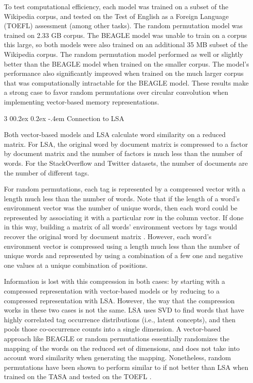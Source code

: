 \documentclass[man,floatsintext,donotrepeattitle]{apa6}
\makeatletter
\renewcommand{\subsubsection}{%
  \@startsection
  {subsubsection}%
  {3}%
  {\parindent}%
  {0\baselineskip \@plus 0.2ex \@minus 0.2ex}%
  {-.4em}%
  {\normalfont\normalsize\bfseries\addperi}}
\makeatother
\begin{document}
To test computational efficiency, each model was trained on a subset of the Wikipedia corpus, and tested on the Test of English as a Foreign Language (TOEFL) assessment (among other tasks).
The random permutation model was trained on \num{2.33} GB corpus.
The BEAGLE model was unable to train on a corpus this large, so both models were also trained on an additional \num{35} MB subset of the Wikipedia corpus.
The random permutation model performed as well or slightly better than the BEAGLE model when trained on the smaller corpus.
The model's performance also significantly improved when trained on the much larger corpus that was computationally intractable for the BEAGLE model.
These results make a strong case to favor random permutations over circular convolution when implementing vector-based memory representations.

\subsubsection{Connection to LSA}

Both vector-based models and LSA calculate word similarity on a reduced matrix.
For LSA, the original word by document matrix is compressed to a factor by document matrix and the number of factors is much less than the number of words.
For the StackOverflow and Twitter datasets, the number of documents are the number of different tags.

For random permutations, each tag is represented by a compressed vector with a length much less than the number of words.
Note that if the length of a word's environment vector was the number of unique words, then each word could be represented by associating it with a particular row in the column vector.
If done in this way, building a matrix of all words' environment vectors by tags would recover the original word by document matrix \parencite{Kanerva2000}.
However, each word's environment vector is compressed using a length much less than the number of unique words and represented by using a combination of a few one and negative one values at a unique combination of positions. 

Information is lost with this compression in both cases: by starting with a compressed representation with vector-based models or by reducing to a compressed representation with LSA.
However, the way that the compression works in these two cases is not the same.
LSA uses SVD to find words that have highly correlated tag occurrence distributions (i.e., latent concepts), and then pools those co-occurrence counts into a single dimension.
A vector-based approach like BEAGLE or random permutations essentially randomizes the mapping of the words on the reduced set of dimensions, and does not take into account word similarity when generating the mapping.
Nonetheless, random permutations have been shown to perform similar to if not better than LSA when trained on the TASA and tested on the TOEFL \parencites{Sahlgren2008,Jones2007}.
\end{document}
